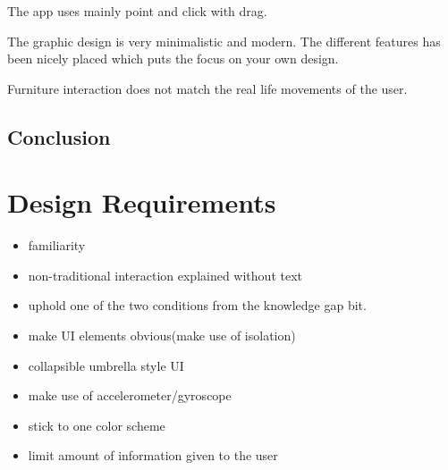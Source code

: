 The app uses mainly point and click with drag.

The graphic design is very minimalistic and modern. The different features has been nicely placed which puts the focus on your own design. 

Furniture interaction does not match the real life movements of the user.

\subsection{Conclusion}



\section{Design Requirements}

\begin{itemize}
\item familiarity
\item non-traditional interaction explained without text
\item uphold one of the two conditions from the knowledge gap bit. 
\item make UI elements obvious(make use of isolation)
\item collapsible umbrella style UI
\item make use of accelerometer/gyroscope
\item stick to one color scheme
\item limit amount of information given to the user
\end{itemize}
